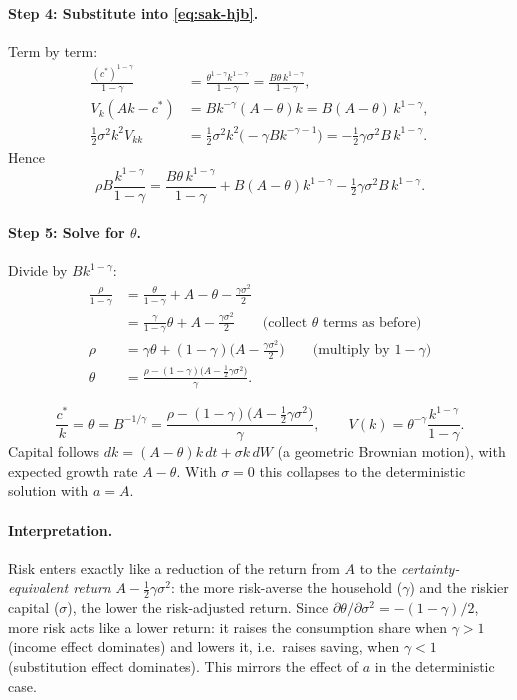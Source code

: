 \paragraph{Step 4: Substitute into \eqref{eq:sak-hjb}.} Term by term:
\begin{align*}
\frac{(c^*)^{1-\gamma}}{1-\gamma}&=\frac{\theta^{1-\gamma}k^{1-\gamma}}{1-\gamma}=\frac{B\theta\,k^{1-\gamma}}{1-\gamma},\\
V_k(Ak-c^*)&=Bk^{-\gamma}(A-\theta)k=B(A-\theta)\,k^{1-\gamma},\\
\tfrac12\sigma^2k^2V_{kk}&=\tfrac12\sigma^2k^2\big(-\gamma Bk^{-\gamma-1}\big)=-\tfrac12\gamma\sigma^2B\,k^{1-\gamma}.
\end{align*}
Hence
\[
\rho B\frac{k^{1-\gamma}}{1-\gamma}=\frac{B\theta\,k^{1-\gamma}}{1-\gamma}+B(A-\theta)k^{1-\gamma}-\tfrac12\gamma\sigma^2B\,k^{1-\gamma}.
\]
\paragraph{Step 5: Solve for $\theta$.} Divide by $Bk^{1-\gamma}$:
\begin{align*}
\frac{\rho}{1-\gamma}&=\frac{\theta}{1-\gamma}+A-\theta-\frac{\gamma\sigma^2}{2}\\
&=\frac{\gamma}{1-\gamma}\theta+A-\frac{\gamma\sigma^2}{2}\qquad\text{(collect $\theta$ terms as before)}\\
\rho&=\gamma\theta+(1-\gamma)\Big(A-\frac{\gamma\sigma^2}{2}\Big)\qquad\text{(multiply by $1-\gamma$)}\\
\theta&=\frac{\rho-(1-\gamma)\big(A-\tfrac12\gamma\sigma^2\big)}{\gamma}.
\end{align*}

\begin{keybox}[title=Stochastic AK model: consumption rule]
\[
\frac{c^*}{k}=\theta=B^{-1/\gamma}=\frac{\rho-(1-\gamma)\big(A-\tfrac12\gamma\sigma^2\big)}{\gamma},\qquad V(k)=\theta^{-\gamma}\frac{k^{1-\gamma}}{1-\gamma}.
\]
Capital follows $dk=(A-\theta)k\,dt+\sigma k\,dW$ (a geometric Brownian motion), with expected growth rate $A-\theta$.
With $\sigma=0$ this collapses to the deterministic solution with $a=A$.
\end{keybox}
\paragraph{Interpretation.} Risk enters exactly like a reduction of the return from $A$ to the \emph{certainty-equivalent return} $A-\tfrac12\gamma\sigma^2$: the more risk-averse the household ($\gamma$) and the riskier capital ($\sigma$), the lower the risk-adjusted return. Since $\partial\theta/\partial\sigma^2=-(1-\gamma)/2$, more risk acts like a lower return: it raises the consumption share when $\gamma>1$ (income effect dominates) and lowers it, i.e.\ raises saving, when $\gamma<1$ (substitution effect dominates). This mirrors the effect of $a$ in the deterministic case.

